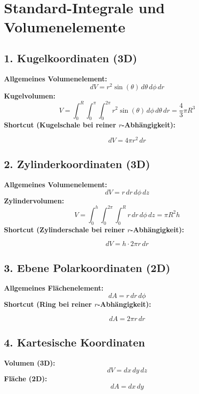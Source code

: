 \section*{Standard-Integrale und Volumenelemente}

\subsection*{1. Kugelkoordinaten (3D)}
\textbf{Allgemeines Volumenelement:}
\[
dV = r^2 \sin(\theta) \, d\theta \, d\phi \, dr
\]
\textbf{Kugelvolumen:}
\[
V = \int_{0}^{R} \int_{0}^{\pi} \int_{0}^{2\pi} r^2 \sin(\theta) \, d\phi \, d\theta \, dr = \frac{4}{3}\pi R^3
\]
\textbf{Shortcut (Kugelschale bei reiner $r$-Abhängigkeit):}
\begin{formulabox}
	\[
	dV = 4\pi r^2 \, dr
	\]
\end{formulabox}

\subsection*{2. Zylinderkoordinaten (3D)}
\textbf{Allgemeines Volumenelement:}
\[
dV = r \, dr \, d\phi \, dz
\]
\textbf{Zylindervolumen:}
\[
V = \int_{0}^{h} \int_{0}^{2\pi} \int_{0}^{R} r \, dr \, d\phi \, dz = \pi R^2 h
\]
\textbf{Shortcut (Zylinderschale bei reiner $r$-Abhängigkeit):}
\begin{formulabox}
	\[
	dV = h \cdot 2\pi r \, dr
	\]
\end{formulabox}

\subsection*{3. Ebene Polarkoordinaten (2D)}
\textbf{Allgemeines Flächenelement:}
\[
dA = r \, dr \, d\phi
\]
\textbf{Shortcut (Ring bei reiner $r$-Abhängigkeit):}
\begin{formulabox}
	\[
	dA = 2\pi r \, dr
	\]
\end{formulabox}

\subsection*{4. Kartesische Koordinaten}
\textbf{Volumen (3D):}
\[
dV = dx \, dy \, dz
\]
\textbf{Fläche (2D):}
\[
dA = dx \, dy
\]

